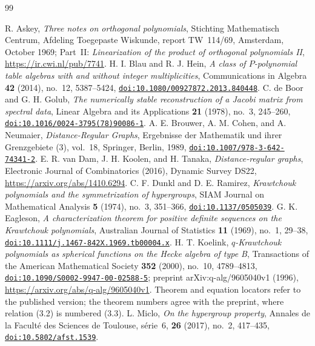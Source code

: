 \begin{thebibliography}{99}

 R. Askey, \emph{Three notes on orthogonal polynomials}, Stichting Mathematisch Centrum, Afdeling Toegepaste Wiskunde, report TW~114/69, Amsterdam, October 1969; Part~II: \emph{Linearization of the product of orthogonal polynomials II}, \url{https://ir.cwi.nl/pub/7741}.
 H. I. Blau and R. J. Hein, \emph{A class of $P$-polynomial table algebras with and without integer multiplicities}, Communications in Algebra \textbf{42} (2014), no.~12, 5387--5424, \href{https://doi.org/10.1080/00927872.2013.840448}{\nolinkurl{doi:10.1080/00927872.2013.840448}}.
 C. de Boor and G. H. Golub, \emph{The numerically stable reconstruction of a Jacobi matrix from spectral data}, Linear Algebra and its Applications \textbf{21} (1978), no.~3, 245--260, \href{https://doi.org/10.1016/0024-3795(78)90086-1}{\nolinkurl{doi:10.1016/0024-3795(78)90086-1}}.
 A. E. Brouwer, A. M. Cohen, and A. Neumaier, \emph{Distance-Regular Graphs}, Ergebnisse der Mathematik und ihrer Grenzgebiete (3), vol.~18, Springer, Berlin, 1989, \href{https://doi.org/10.1007/978-3-642-74341-2}{\nolinkurl{doi:10.1007/978-3-642-74341-2}}.
 E. R. van Dam, J. H. Koolen, and H. Tanaka, \emph{Distance-regular graphs}, Electronic Journal of Combinatorics (2016), Dynamic Survey DS22, \url{https://arxiv.org/abs/1410.6294}.
 C. F. Dunkl and D. E. Ramirez, \emph{Krawtchouk polynomials and the symmetrization of hypergroups}, SIAM Journal on Mathematical Analysis \textbf{5} (1974), no.~3, 351--366, \href{https://doi.org/10.1137/0505039}{\nolinkurl{doi:10.1137/0505039}}.
 G. K. Eagleson, \emph{A characterization theorem for positive definite sequences on the Krawtchouk polynomials}, Australian Journal of Statistics \textbf{11} (1969), no.~1, 29--38, \href{https://doi.org/10.1111/j.1467-842X.1969.tb00004.x}{\nolinkurl{doi:10.1111/j.1467-842X.1969.tb00004.x}}.
 H. T. Koelink, \emph{$q$-Krawtchouk polynomials as spherical functions on the Hecke algebra of type B}, Transactions of the American Mathematical Society \textbf{352} (2000), no.~10, 4789--4813, \href{https://doi.org/10.1090/S0002-9947-00-02588-5}{\nolinkurl{doi:10.1090/S0002-9947-00-02588-5}}; preprint arXiv:q-alg/9605040v1 (1996), \url{https://arxiv.org/abs/q-alg/9605040v1}. Theorem and equation locators refer to the published version; the theorem numbers agree with the preprint, where relation (3.2) is numbered (3.3).
 L. Miclo, \emph{On the hypergroup property}, Annales de la Facult\'e des Sciences de Toulouse, s\'erie~6, \textbf{26} (2017), no.~2, 417--435, \href{https://doi.org/10.5802/afst.1539}{\nolinkurl{doi:10.5802/afst.1539}}.

\end{thebibliography}
